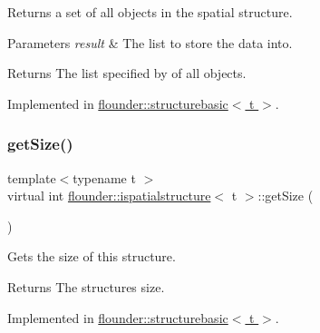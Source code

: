 Returns a set of all objects in the spatial structure. 


\begin{DoxyParams}{Parameters}
{\em result} & The list to store the data into. \\
\hline
\end{DoxyParams}
\begin{DoxyReturn}{Returns}
The list specified by of all objects. 
\end{DoxyReturn}


Implemented in \hyperlink{classflounder_1_1structurebasic_a6e3292d86b68b829540f011593dec6eb}{flounder\+::structurebasic$<$ t $>$}.

\mbox{\label{classflounder_1_1ispatialstructure_a9daf7778a9bde304e08070eaeffb8fbd}} 
\subsubsection{\texorpdfstring{get\+Size()}{getSize()}}
{\footnotesize\ttfamily template$<$typename t $>$ \\
virtual int \hyperlink{classflounder_1_1ispatialstructure}{flounder\+::ispatialstructure}$<$ t $>$\+::get\+Size (\begin{DoxyParamCaption}{ }\end{DoxyParamCaption})\hspace{0.3cm}{\ttfamily [pure virtual]}}



Gets the size of this structure. 

\begin{DoxyReturn}{Returns}
The structures size. 
\end{DoxyReturn}


Implemented in \hyperlink{classflounder_1_1structurebasic_aaef414a91ef6bd96982b1f7c10ae31b2}{flounder\+::structurebasic$<$ t $>$}.

\mbox{\label{classflounder_1_1ispatialstructure_af170238d021510abf93e9dabbc5fad10}} 

